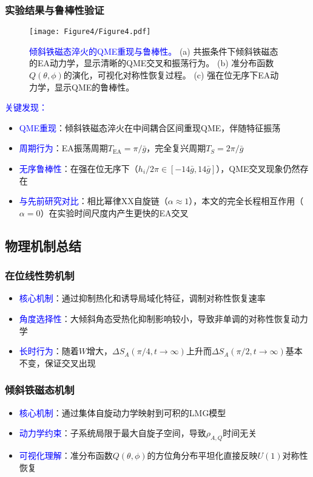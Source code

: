 \documentclass[11pt,a4paper]{article}
\begin{document}
\subsubsection{实验结果与鲁棒性验证}
\begin{figure}[H]
    \centering
    \texttt{[image: Figure4/Figure4.pdf]}
    \caption{
        \textcolor{blue}{倾斜铁磁态淬火的QME重现与鲁棒性。}
        (a) 共振条件下倾斜铁磁态的EA动力学，显示清晰的QME交叉和振荡行为。
        (b) 准分布函数$Q(\theta,\phi)$的演化，可视化对称性恢复过程。
        (c) 强在位无序下EA动力学，显示QME的鲁棒性。
    }
    \label{fig:QME_reemergence_FM}
\end{figure}

\textcolor{blue}{关键发现：}
\begin{itemize}
    \item \textcolor{blue}{QME重现}：倾斜铁磁态淬火在中间耦合区间重现QME，伴随特征振荡
    \item \textcolor{blue}{周期行为}：EA振荡周期$T_{\text{EA}} = \pi/\bar{g}$，完全复兴周期$T_S = 2\pi/\bar{g}$
    \item \textcolor{blue}{无序鲁棒性}：在强在位无序下（$h_i/2\pi \in [-14\bar{g}, 14\bar{g}]$），QME交叉现象仍然存在
    \item \textcolor{blue}{与先前研究对比}：相比幂律XX自旋链（$\alpha \approx 1$），本文的完全长程相互作用（$\alpha = 0$）在实验时间尺度内产生更快的EA交叉
\end{itemize}

\subsection{物理机制总结}

\subsubsection{在位线性势机制}
\begin{itemize}
    \item \textcolor{blue}{核心机制}：通过抑制热化和诱导局域化特征，调制对称性恢复速率
    \item \textcolor{blue}{角度选择性}：大倾斜角态受热化抑制影响较小，导致非单调的对称性恢复动力学
    \item \textcolor{blue}{长时行为}：随着$W$增大，$\Delta S_A(\pi/4, t\rightarrow\infty)$上升而$\Delta S_A(\pi/2, t\rightarrow\infty)$基本不变，保证交叉出现
\end{itemize}

\subsubsection{倾斜铁磁态机制}
\begin{itemize}
    \item \textcolor{blue}{核心机制}：通过集体自旋动力学映射到可积的LMG模型
    \item \textcolor{blue}{动力学约束}：子系统局限于最大自旋子空间，导致$\rho_{A,Q}$时间无关
    \item \textcolor{blue}{可视化理解}：准分布函数$Q(\theta,\phi)$的方位角分布平坦化直接反映$U(1)$对称性恢复
\end{itemize}
\end{document}
